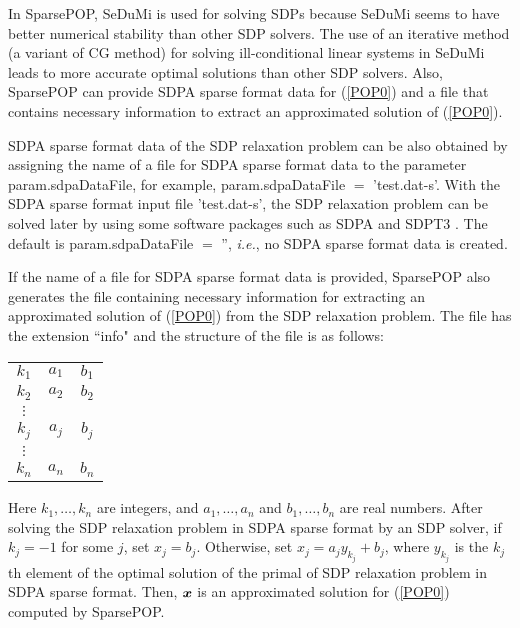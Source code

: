 In SparsePOP,  SeDuMi \cite{STRUM99} is used for solving SDPs  because
SeDuMi seems to have better numerical stability than other SDP solvers.  
The use of   an iterative method (a variant of CG method) for solving ill-conditional linear systems in SeDuMi
leads to more accurate optimal solutions than other SDP solvers. %
Also, SparsePOP can provide SDPA sparse format data for (\ref{POP0}) and a file that contains
 necessary information to extract an approximated solution of (\ref{POP0}).

SDPA sparse  format data of the SDP relaxation problem can be also obtained by
assigning the name of a file for SDPA sparse format data to
the parameter {\sf param.sdpaDataFile}, for example,  {\sf param.sdpaDataFile} $=$ 'test.dat-s'.
With the SDPA sparse format input file 'test.dat-s',
 the SDP relaxation problem can be solved later by using some software packages
such as SDPA \cite{YAMASHITA03} and SDPT3 \cite{SDPT3}.
The default is  {\sf param.sdpaDataFile} %
$ = $ '', {\it i.e.}, no SDPA sparse format  data
is created.

 If  the name of a file for SDPA sparse format data is provided, SparsePOP also generates the file containing necessary information for extracting an approximated solution of (\ref{POP0}) from the SDP relaxation problem. %
The file has the extension ``info" and  the structure of the file is as follows:
\begin{table}[htdp]
\begin{tabular}{ccc}
$k_1$&$a_1$&$b_1$\\
$k_2$&$a_2$&$b_2$\\
$\vdots$&&\\
$k_j$&$a_j$&$b_j$\\
$\vdots$&&\\
$k_n$&$a_n$&$b_n$
\end{tabular}
\label{structureOfinfo}
\end{table}%
Here $k_1, \ldots, k_n$ are integers, and $a_1,\ldots, a_n$ and $b_1,\ldots, b_n$ are real numbers. After solving the SDP relaxation problem  in SDPA sparse format by an SDP solver,
 if $k_j = -1$ for some $j$, set $x_{j}=b_j$. Otherwise, set $x_{j} = a_j y_{k_j}+b_j$, where $y_{k_j}$ is the $k_j$th element of the optimal solution of the primal of SDP relaxation problem in SDPA sparse 
format. Then, $\x$ is an approximated solution for (\ref{POP0}) computed by SparsePOP.

